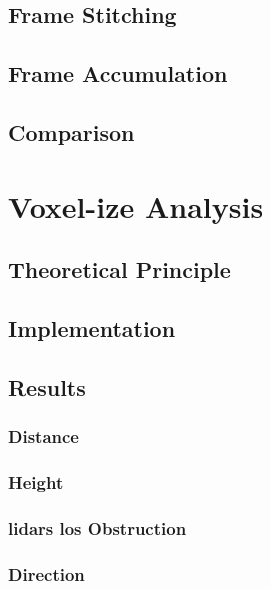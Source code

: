 \subsection{Frame Stitching}
\label{subsec:lidar-interference:frame-stitching}
	
\subsection{Frame Accumulation}
\label{subsec:lidar-interference:frame-accumulation}

\subsection{Comparison}


\section{Voxel-ize Analysis}
\subsection{Theoretical Principle}
\subsection{Implementation}
\subsection{Results}
\subsubsection{Distance}
\subsubsection{Height}
\subsubsection{\acp{lidar} \ac{los} Obstruction}
\subsubsection{Direction}

